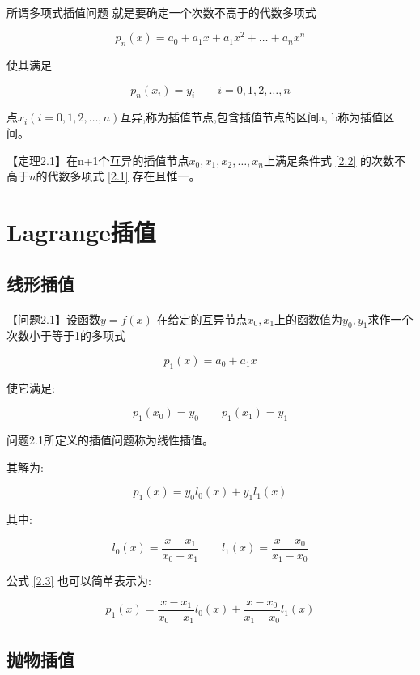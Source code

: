 \documentclass[12pt]{report}
\begin{document}
\paragraph{ } 所谓多项式插值问题
就是要确定一个次数不高于的代数多项式

\[ p_n(x) = a_0+a_1x + a_1x^2 +\ldots+ a_nx^n \tag{2.1} \label{2.1} \]

使其满足

\[ p_n(x_i)=y_i \qquad i=0,1,2,\ldots,n\tag{2.2} \label{2.2} \]

点\( x_i(i=0,1,2,\ldots,n) \)互异,称为插值节点,包含插值节点的区间a, b称为插值区间。

【定理2.1】\quad 在n+1个互异的插值节点\( x_0,x_1,x_2,\ldots,x_n \)上满足条件式
\eqref{2.2} 的次数不高于$n$的代数多项式 \eqref{2.1} 存在且惟一。

\section{Lagrange插值}

\subsection{线形插值}

\paragraph{ } 【问题2.1】\quad 设函数$y=f(x)$
在给定的互异节点$x_0,x_1$上的函数值为$y_0,y_1$求作一个次数小于等于1的多项式

\[ p_1(x)= a_0 + a_1x \]

使它满足:

\[ p_1(x_0) = y_0 \qquad p_1(x_1) = y_1 \]

问题2.1所定义的插值问题称为线性插值。

其解为:

\[ p_1(x) = y_0l_0(x) + y_1l_1(x) \tag{2.3} \label{2.3} \]

其中:

\[ l_0(x)=\frac{x-x_1}{x_0-x_1} \qquad l_1(x)=\frac{x-x_0}{x_1-x_0} \]

公式 \eqref{2.3} 也可以简单表示为:

\[
	p_1(x) = \frac{x-x_1}{x_0-x_1}l_0(x) +
	\frac{x-x_0}{x_1-x_0}l_1(x) \tag{2.4} \label{2.4}
\]

\subsection{抛物插值}
\end{document}
